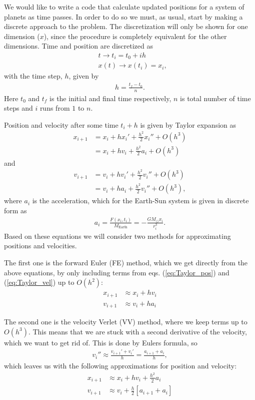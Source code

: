 \documentclass[12pt, a4paper]{article}
\begin{document}
We would like to write a code that calculate updated positions for a system of planets as time 
passes. In order to do so we must, as usual, start by making a discrete approach to the problem. 
The discretization will only be shown for one dimension ($x$), since the procedure is completely
equivalent for the other dimensions. Time and position are discretized as 
\begin{align*}
&t  \rightarrow t_i = t_0 + ih \\
&x(t)  \rightarrow x(t_i) = x_i, 
\end{align*}   
with the time step, $h$, given by 
\begin{align*}
h = \frac{t_f - t_0}{n}.  
\end{align*}
Here $t_0$ and $t_f$ is the initial and final time respectively, $n$ is total number of time steps and 
$i$ runs from $1$ to $n$. 

Position and velocity after some time $t_i+h$ is given by Taylor expansion as 
\begin{align}
x_{i+1} & = x_i + hx_i' + \frac{h^2}{2}x_i'' + O(h^3) \nonumber \\ 
	    & = x_i + hv_i + \frac{h^2}{2}a_i + O(h^3)
\label{eq:Taylor_pos}	    
\end{align}
and 
\begin{align}
v_{i+1} & = v_i + hv_i' + \frac{h^2}{2}v_i'' + O(h^3) \nonumber \\
		& = v_i + ha_i + \frac{h^2}{2}v_i'' + O(h^3),  
\label{eq:Taylor_vel}
\end{align}
where $a_i$ is the acceleration, which for the Earth-Sun system is given in discrete form as  
\begin{align*}
a_i = \frac{F(x_i,t_i)}{M_{\text{Earth}}} = - \frac{GM_{\odot}x_i}{r_i^3}. 
\end{align*}
Based on these equations we will consider two methods for approximating positions and velocities.

The first one is the forward Euler (FE) method, which we get directly from the above equations, by only 
including terms from eqs. (\ref{eq:Taylor_pos}) and (\ref{eq:Taylor_vel}) up to $O(h^2)$: 
\begin{align*}
x_{i+1} & \approx x_i + hv_i \\ 
v_{i+1} & \approx v_i + ha_i 
\end{align*}


The second one is the velocity Verlet (VV) method, where we keep terms up to $O(h^3)$. This means that 
we are stuck with a second derivative of the velocity, which we want to get rid of. This is done by 
Eulers formula, so 
\begin{align*}
v_i'' \approx \frac{v_{i+1}'+v_i'}{h} = \frac{a_{i+1}+a_i}{h},  
\end{align*}
which leaves us with the following approximations for position and velocity: 
\begin{align*}
x_{i+1} & \approx x_i + hv_i + \frac{h^2}{2}a_i  \\
v_{i+1} & \approx v_i + \frac{h}{2}\left[ a_{i+1} + a_i  \right] 
\end{align*}
\end{document}
